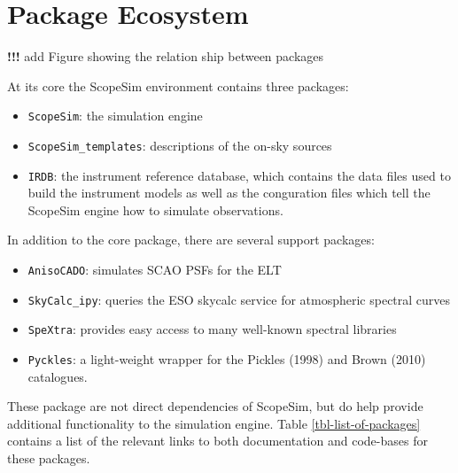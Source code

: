 

\section{Package Ecosystem%
  \label{package-ecosystem}%
}

\textbf{!!!} add Figure showing the relation ship between packages

At its core the ScopeSim environment contains three packages:

\begin{itemize}
\item \texttt{ScopeSim}: the simulation engine

\item \texttt{ScopeSim\_templates}: descriptions of the on-sky sources

\item \texttt{IRDB}: the instrument reference database, which contains the data files used to build the instrument models as well as the conguration files which tell the ScopeSim engine how to simulate observations.
\end{itemize}

In addition to the core package, there are several support packages:

\begin{itemize}
\item \texttt{AnisoCADO}: simulates SCAO PSFs for the ELT

\item \texttt{SkyCalc\_ipy}: queries the ESO skycalc service for atmospheric spectral curves

\item \texttt{SpeXtra}: provides easy access to many well-known spectral libraries

\item \texttt{Pyckles}: a light-weight wrapper for the Pickles (1998) and Brown (2010) catalogues.
\end{itemize}

These package are not direct dependencies of ScopeSim, but do help provide additional functionality to the simulation engine.
Table \ref{tbl-list-of-packages} contains a list of the relevant links to both documentation and code-bases for these packages.


